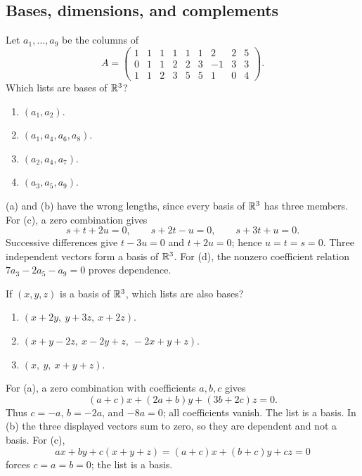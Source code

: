 \subsection*{Bases, dimensions, and complements}

\begin{problem}\label{ex:03:chosen-columns}
Let \(a_1,\ldots,a_9\) be the columns of
\[
A=\begin{pmatrix}1&1&1&1&1&1&2&2&5\\0&1&1&2&2&3&-1&3&3\\1&1&2&3&5&5&1&0&4\end{pmatrix}.
\]
Which lists are bases of \(\mathbb R^3\)?
\begin{enumerate}
\item \((a_1,a_2)\).
\item \((a_1,a_4,a_6,a_8)\).
\item \((a_2,a_4,a_7)\).
\item \((a_3,a_5,a_9)\).
\end{enumerate}
\end{problem}
\begin{solution}
(a) and (b) have the wrong lengths, since every basis of \(\mathbb R^3\) has three members.
For (c), a zero combination gives
\[
s+t+2u=0,\qquad s+2t-u=0,\qquad s+3t+u=0.
\]
Successive differences give \(t-3u=0\) and \(t+2u=0\); hence
\(u=t=s=0\). Three independent vectors form a basis of \(\mathbb R^3\).
For (d), the nonzero coefficient relation
\(7a_3-2a_5-a_9=0\) proves dependence.
\end{solution}

\begin{problem}\label{ex:03:combining-basis}
If \((x,y,z)\) is a basis of \(\mathbb R^3\), which lists are also bases?
\begin{enumerate}
\item \((x+2y,\ y+3z,\ x+2z)\).
\item \((x+y-2z,\ x-2y+z,\ -2x+y+z)\).
\item \((x,\ y,\ x+y+z)\).
\end{enumerate}
\end{problem}
\begin{solution}
For (a), a zero combination with coefficients \(a,b,c\) gives
\[
(a+c)x+(2a+b)y+(3b+2c)z=0.
\]
Thus \(c=-a\), \(b=-2a\), and \(-8a=0\); all coefficients vanish.
The list is a basis. In (b) the three displayed vectors sum to zero,
so they are dependent and not a basis. For (c),
\[
ax+by+c(x+y+z)=(a+c)x+(b+c)y+cz=0
\]
forces \(c=a=b=0\); the list is a basis.
\end{solution}

